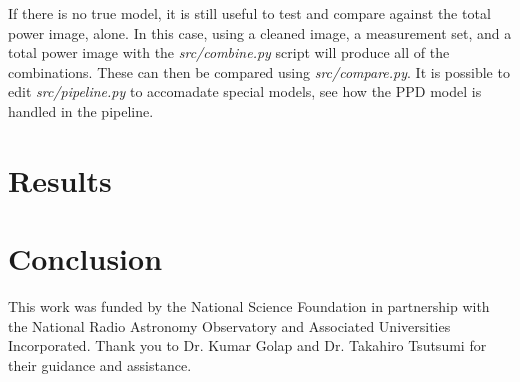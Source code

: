 \documentclass[manuscript,linenumbers]{aastex62}
\begin{document}
If there is no true model, it is still useful to test and compare against the total power image, alone. In this case, using a cleaned image, a measurement set, and a total power image with the \textit{src/combine.py} script will produce all of the combinations. These can then be compared using \textit{src/compare.py}. It is possible to edit \textit{src/pipeline.py} to accomadate special models, see how the PPD model is handled in the pipeline. 


\section{Results}

\section{Conclusion}


\acknowledgments
This work was funded by the National Science Foundation in partnership with the National Radio Astronomy Observatory and Associated Universities Incorporated. Thank you to Dr. Kumar Golap and Dr. Takahiro Tsutsumi for their guidance and assistance. 


\end{document}
